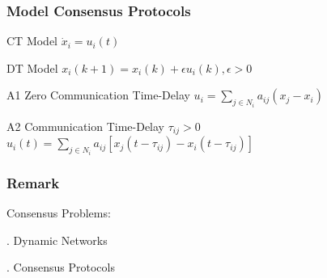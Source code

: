 \documentclass{beamer}
\begin{document}
\begin{frame}
\frametitle{Model Consensus Protocols}


\begin{block}{CT Model}
    $\dot{x}_i = u_i(t)$
\end{block}

\begin{alertblock}{DT Model}
    $x_i(k+1) = x_i(k) + \epsilon u_i(k), \epsilon>0$
\end{alertblock}


\begin{block}{A1 Zero Communication Time-Delay}
    $u_i = \sum_{j\in N_i}a_{ij}(x_j-x_i)$
\end{block}

\begin{alertblock}{A2 Communication Time-Delay $\tau_{ij}>0$}
    $u_i(t) = \sum_{j\in N_i}a_{ij}[x_j(t-\tau_{ij})-x_i(t-\tau_{ij})]$
\end{alertblock}


\end{frame}
\begin{frame}
    \frametitle{Remark}
    Consensus Problems:

    . Dynamic Networks 

    . Consensus Protocols
\end{frame}
\end{document}
